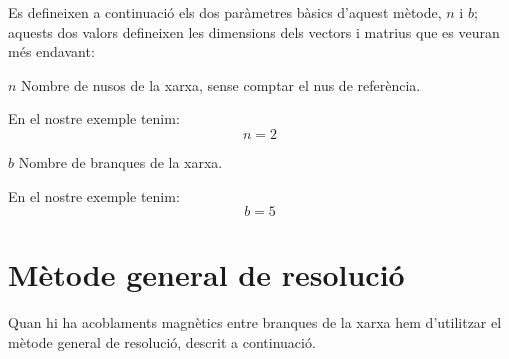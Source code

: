 Es defineixen a continuació els dos
paràmetres bàsics d'aquest mètode, $n$ i $b$; aquests dos valors
defineixen les dimensions dels vectors i matrius que es veuran més
endavant:
\begin{list}{}
   {\setlength{\labelwidth}{7mm} \setlength{\leftmargin}{9mm} \setlength{\labelsep}{2mm}}
   \item[$n$] Nombre de nusos de la xarxa, sense comptar el nus de referència.

   En el nostre exemple tenim:
   \[ n=2 \]

   \item[$b$] Nombre de branques de la xarxa.

   En el nostre exemple tenim:
   \[ b=5 \]
\end{list}

\section{Mètode general de resolució}

Quan hi ha acoblaments
magnètics entre branques de la xarxa hem d'utilitzar el mètode
general de resolució, descrit a continuació.

